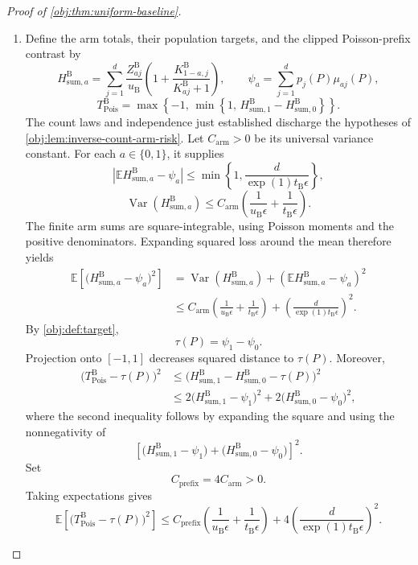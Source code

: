 \documentclass[11pt]{article}
\begin{document}
\begin{proof}[Proof of \cref{obj:thm:uniform-baseline}]
\begin{enumerate}
\item
Define the arm totals, their population targets, and the clipped Poisson-prefix contrast by
\[
H_{\mathrm{sum},a}^{\mathrm B}
=
\sum_{j=1}^d
\frac{Z_{aj}^{\mathrm B}}{u_{\mathrm B}}
\left(1+\frac{K_{1-a,j}^{\mathrm B}}{K_{aj}^{\mathrm B}+1}\right),
\qquad
\psi_a
=
\sum_{j=1}^d p_j(P)\mu_{aj}(P),
\]
\[
T_{\mathrm{Pois}}^{\mathrm B}
=
\max\!\left\{-1,\,
\min\!\left\{1,\,
H_{\mathrm{sum},1}^{\mathrm B}
-
H_{\mathrm{sum},0}^{\mathrm B}
\right\}\right\}.
\]
The count laws and independence just established discharge the hypotheses of
\cref{obj:lem:inverse-count-arm-risk}. Let \(C_{\mathrm{arm}}>0\) be its universal variance constant. For each \(a\in\{0,1\}\), it supplies
\[
\left|
\mathbb E H_{\mathrm{sum},a}^{\mathrm B}-\psi_a
\right|
\le
\min\!\left\{
1,\frac{d}{\exp(1)t_{\mathrm B}\epsilon}
\right\},
\]
\[
\operatorname{Var}\!\left(H_{\mathrm{sum},a}^{\mathrm B}\right)
\le
C_{\mathrm{arm}}
\left(
\frac{1}{u_{\mathrm B}\epsilon}
+
\frac{1}{t_{\mathrm B}\epsilon}
\right).
\]
The finite arm sums are square-integrable, using Poisson moments and the positive denominators. Expanding squared loss around the mean therefore yields
\[
\begin{aligned}
\mathbb E\!\left[
\bigl(H_{\mathrm{sum},a}^{\mathrm B}-\psi_a\bigr)^2
\right]
&=
\operatorname{Var}\!\left(H_{\mathrm{sum},a}^{\mathrm B}\right)
+
\left(\mathbb E H_{\mathrm{sum},a}^{\mathrm B}-\psi_a\right)^2\\
&\le
C_{\mathrm{arm}}
\left(
\frac{1}{u_{\mathrm B}\epsilon}
+
\frac{1}{t_{\mathrm B}\epsilon}
\right)
+
\left(\frac{d}{\exp(1)t_{\mathrm B}\epsilon}\right)^2.
\end{aligned}
\]
By \cref{obj:def:target},
\[
\tau(P)=\psi_1-\psi_0.
\]
Projection onto \([-1,1]\) decreases squared distance to \(\tau(P)\). Moreover,
\[
\begin{aligned}
\bigl(T_{\mathrm{Pois}}^{\mathrm B}-\tau(P)\bigr)^2
&\le
\bigl(H_{\mathrm{sum},1}^{\mathrm B}
-H_{\mathrm{sum},0}^{\mathrm B}-\tau(P)\bigr)^2\\
&\le
2\bigl(H_{\mathrm{sum},1}^{\mathrm B}-\psi_1\bigr)^2
+
2\bigl(H_{\mathrm{sum},0}^{\mathrm B}-\psi_0\bigr)^2,
\end{aligned}
\]
where the second inequality follows by expanding the square and using the nonnegativity of
\[
\left[
\bigl(H_{\mathrm{sum},1}^{\mathrm B}-\psi_1\bigr)
+
\bigl(H_{\mathrm{sum},0}^{\mathrm B}-\psi_0\bigr)
\right]^2.
\]
Set
\[
C_{\mathrm{prefix}}=4C_{\mathrm{arm}}>0.
\]
Taking expectations gives
\[
\mathbb E\!\left[
\bigl(T_{\mathrm{Pois}}^{\mathrm B}-\tau(P)\bigr)^2
\right]
\le
C_{\mathrm{prefix}}
\left(
\frac{1}{u_{\mathrm B}\epsilon}
+
\frac{1}{t_{\mathrm B}\epsilon}
\right)
+
4\left(\frac{d}{\exp(1)t_{\mathrm B}\epsilon}\right)^2.
\]


\end{enumerate}
\end{proof}
\end{document}
